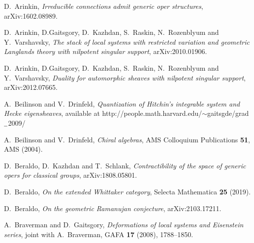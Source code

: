 \documentclass[9pt]{amsart}
\theoremstyle{remark}
\theoremstyle{definition}
\theoremstyle{remark}
\numberwithin{equation}{section}
\begin{document}
\begin{thebibliography}{99}

 D.~Arinkin, {\it Irreducible connections admit generic oper structures}, arXiv:1602.08989.


 D.~Arinkin, D.Gaitsgory, D.~Kazhdan, S.~Raskin, N.~Rozenblyum and Y.~Varshavsky, \newline
{\em The stack of local systems with restricted variation and geometric Langlands theory with nilpotent singular support},
arXiv:2010.01906. 

 D.~Arinkin, D.Gaitsgory, D.~Kazhdan, S.~Raskin, N.~Rozenblyum and Y.~Varshavsky, \newline
{\em Duality for automorphic sheaves with nilpotent singular support}, 
arXiv:2012.07665.

 A.~Beilinson and V.~Drinfeld, {\it Quantization of Hitchin's integrable system and Hecke eigensheaves}, 
available at http://people.math.harvard.edu/$\sim$gaitsgde/grad$\underline{\text{\,\,\,}}$2009/

 A.~Beilinson and V.~Drinfeld, {\it Chiral algebras}, AMS Colloquium Publications {\bf 51}, AMS (2004). 

 D.~Beraldo, D.~Kazhdan and T.~Schlank, {\it Contractibility of the space of generic opers for classical groups}, \hfill \newline
 arXiv:1808.05801.

 D.~Beraldo, {\it On the extended Whittaker category}, Selecta Mathematica {\bf 25} (2019). 

 D.~Beraldo, {\it On the geometric Ramanujan conjecture}, arXiv:2103.17211.

 A.~Braverman and D.~Gaitsgory, {\it Deformations of local systems and Eisenstein series}, \newline
joint with A.~Braverman, GAFA {\bf 17} (2008), 1788--1850.





\end{thebibliography}
\end{document}
